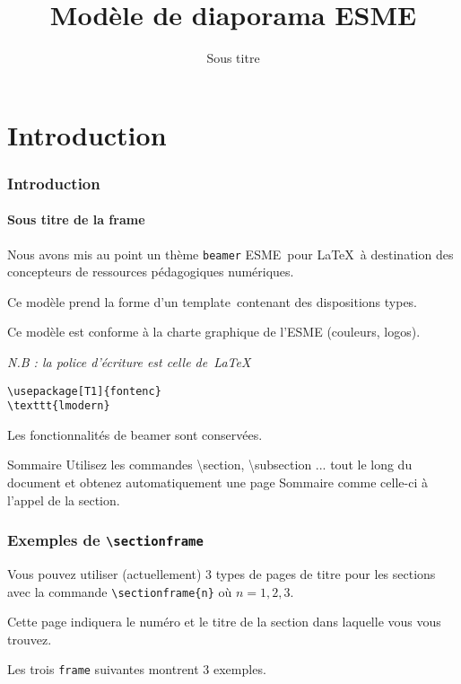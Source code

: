 \documentclass[aspectratio=169]{beamer}
\title{Modèle de diaporama ESME}
\subtitle{Sous titre}
\date[]{}
\author[]{}
\begin{document}
\section{Introduction}

\begin{frame}[fragile] 
\frametitle{Introduction} 
\framesubtitle{Sous titre de la frame} 

Nous avons mis au point un thème \texttt{beamer} \og ESME\fg~pour 
\LaTeX~à destination des concepteurs de ressources pédagogiques 
numériques.\newline

Ce modèle prend la forme d'un \og template\fg~contenant des 
dispositions types.\newline

Ce modèle est conforme à la charte graphique de l'ESME (couleurs, 
logos).

\emph{N.B : la police d'écriture est celle de~\LaTeX}\newline

\begin{verbatim}
\usepackage[T1]{fontenc}
\texttt{lmodern}
\end{verbatim}

Les fonctionnalités de beamer sont conservées.
\end{frame}

\begin{frame}{Sommaire}
    \tableofcontents
    \scriptsize
    Utilisez les commandes \textbackslash section, \textbackslash subsection ...
    tout le long du document et obtenez automatiquement une page Sommaire 
    comme celle-ci à l'appel de la section. 
\end{frame}

\begin{frame} 
    \frametitle{Exemples de \texttt{\textbackslash sectionframe}}

    Vous pouvez utiliser (actuellement) 3 types de pages de titre pour
    les sections avec la commande \texttt{\textbackslash sectionframe\{n\}} 
    où $n=1,2,3$.\newline

    Cette page indiquera le numéro et le titre de la section dans laquelle
    vous vous trouvez.\newline

    Les trois \texttt{frame} suivantes montrent 3 exemples.
\end{frame}
\end{document}
